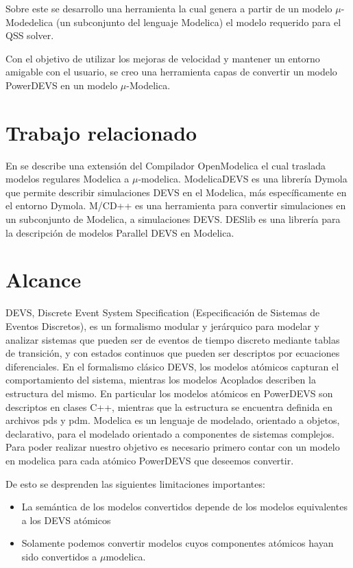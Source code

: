 \documentclass[a4paper,	11pt]{report}
\begin{document}
Sobre este se desarrollo una herramienta la cual genera a partir de un modelo $\mu$-Modedelica \cite{Ber12} (un subconjunto del lenguaje Modelica) el modelo requerido para el QSS solver.

Con el objetivo de utilizar los mejoras de velocidad y mantener un entorno amigable con el usuario, se creo una herramienta capas de convertir un modelo PowerDEVS en un modelo $\mu$-Modelica.


\section{Trabajo relacionado}
En \cite{Ber12} se describe una extensión del Compilador OpenModelica el cual traslada modelos regulares Modelica a $\mu$-modelica. 
ModelicaDEVS \cite{Beltrame06quantisedstate} es una librería Dymola que permite describir simulaciones DEVS en el Modelica, más específicamente en el entorno Dymola.
M/CD++ \cite{conf/mascots/DAbreuW05} es una herramienta para convertir simulaciones en un subconjunto de Modelica, a simulaciones DEVS.
DESlib \cite{Sanz09paralleldevs} es una librería para la descripción de modelos Parallel DEVS en Modelica.


\section{Alcance}
DEVS\cite{Zeigler:2000:TMS:580780}, Discrete Event System Specification (Especificación de Sistemas de Eventos Discretos), es un formalismo modular y jerárquico para modelar y analizar sistemas que pueden ser de eventos de tiempo discreto mediante tablas de transición, y con estados continuos que pueden ser descriptos por ecuaciones diferenciales.
En el formalismo clásico DEVS, los modelos atómicos capturan el comportamiento del sistema, mientras los modelos Acoplados describen la estructura del mismo.
En particular los modelos atómicos en PowerDEVS son descriptos en clases C++, mientras que la estructura se encuentra definida en archivos pds y pdm.
Modelica es un lenguaje de modelado, orientado a objetos, declarativo, para el modelado orientado a componentes de sistemas complejos.
Para poder realizar nuestro objetivo es necesario primero contar con un modelo en modelica\cite{Fritzson02modelica--} para cada atómico PowerDEVS\cite{BK11} que deseemos convertir. 

De esto se desprenden las siguientes limitaciones importantes:
\begin{itemize}
	\item La semántica de los modelos convertidos depende de los modelos equivalentes a los DEVS atómicos 
	\item Solamente podemos convertir modelos cuyos componentes atómicos hayan sido convertidos a $\mu$modelica.
\end{itemize}
\end{document}
